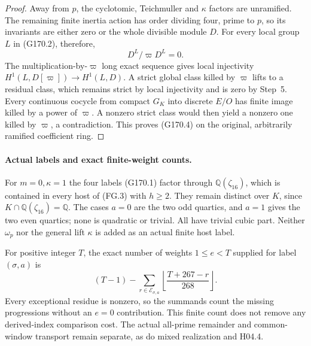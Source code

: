 \begin{proof}
Away from $p$, the cyclotomic, Teichmuller and $\kappa$
factors are unramified.  The remaining finite inertia action
has order dividing four, prime to $p$, so its invariants are
either zero or the whole divisible module $D$.
For every local group $L$ in (G170.2), therefore,
\[
                            D^L/\varpi D^L=0.
 \tag{G170.27}
\]
The multiplication-by-$\varpi$ long exact sequence gives
local injectivity $H^1(L,D[\varpi])\to H^1(L,D)$.
A strict global class killed by $\varpi$ lifts to a residual
class, which remains strict by local injectivity and is zero
by Step~5.
Every continuous cocycle from compact $G_K$ into discrete
$E/O$ has finite image killed by a power of $\varpi$.
A nonzero strict class would then yield a nonzero one killed
by $\varpi$, a contradiction.  This proves (G170.4) on the
original, arbitrarily ramified coefficient ring.
\end{proof}

\paragraph{Actual labels and exact finite-weight counts.}
For $m=0,\kappa=1$ the four labels (G170.1) factor through
$\mathbb Q(\zeta_{16})$, which is contained in every host
of (FG.3) with $h\geq2$.
They remain distinct over $K$, since
$K\cap\mathbb Q(\zeta_{16})=\mathbb Q$.
The cases $a=0$ are the two odd quartics, and $a=1$ gives
the two even quartics; none is quadratic or trivial.
All have trivial cubic part.  Neither $\omega_p$ nor the
general lift $\kappa$ is added as an actual finite host label.

For positive integer $T$, the exact number of weights
$1\leq e<T$ supplied for label $(\sigma,a)$ is
\[
 (T-1)-\sum_{r\in\mathcal E_{\sigma,a}}
                   \left\lfloor\frac{T+267-r}{268}\right\rfloor.
 \tag{G170.28}
\]
Every exceptional residue is nonzero, so the summands count
the missing progressions without an $e=0$ contribution.
This finite count does not remove any derived-index comparison
cost.  The actual all-prime remainder and common-window
transport remain separate, as do mixed realization and H04.4.

